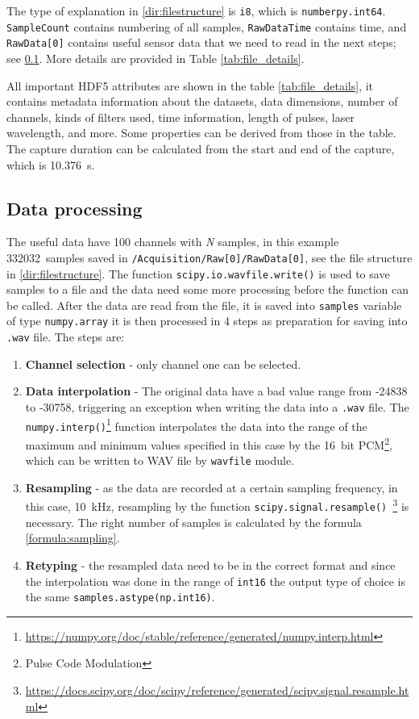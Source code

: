 The type of explanation in \ref{dir:filestructure} is \verb|i8|, which is \verb|numberpy.int64|. \verb|SampleCount| contains numbering of all samples, \verb|RawDataTime| contains time, and \verb|RawData[0]| contains useful sensor data that we need to read in the next steps; see \ref{sec:data_processing}. More details are provided in Table \ref{tab:file_details}.

All important HDF5 attributes are shown in the table \ref{tab:file_details}, it contains metadata information about the datasets, data dimensions, number of channels, kinds of filters used, time information, length of pulses, laser wavelength, and more. Some properties can be derived from those in the table. The capture duration can be calculated from the start and end of the capture, which is \qty{10,376}{\second}.

\subsection{Data processing} \label{sec:data_processing}

The useful data have 100 channels with \textit{N} samples, in this example \qty{332032}{samples} saved in \verb|/Acquisition/Raw[0]/RawData[0]|, see the file structure in \ref{dir:filestructure}. The function \verb|scipy.io.wavfile.write()| is used to save samples to a file and the data need some more processing before the function can be called. After the data are read from the file, it is saved into \verb|samples| variable of type \verb|numpy.array| it is then processed in 4 steps as preparation for saving into \verb|.wav| file. The steps are:

\begin{enumerate}
    \item \textbf{Channel selection} - only channel one can be selected.
    \item \textbf{Data interpolation} - The original data have a bad value range from -24838 to -30758, triggering an exception when writing the data into a \verb|.wav| file. The \verb|numpy.interp()|\footnote{\url{https://numpy.org/doc/stable/reference/generated/numpy.interp.html}} function interpolates the data into the range of the maximum and minimum values specified in this case by the \qty{16}{bit} PCM\footnote{Pulse Code Modulation}, which can be written to WAV file by \verb|wavfile| module.
    \item \textbf{Resampling} - as the data are recorded at a certain sampling frequency, in this case, \qty{10}{\kHz}, resampling by the function \verb|scipy.signal.resample() |\footnote{\url{https://docs.scipy.org/doc/scipy/reference/generated/scipy.signal.resample.html}} is necessary. The right number of samples is calculated by the formula \ref{formula:sampling}.
    \item \textbf{Retyping} - the resampled data need to be in the correct format and since the interpolation was done in the range of \verb|int16| the output type of choice is the same \verb|samples.astype(np.int16)|.
\end{enumerate}

